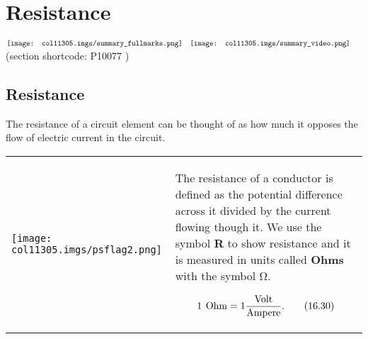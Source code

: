          \section{ Resistance}
    \nopagebreak
            \label{m38776} $ \hspace{-5pt}\begin{array}{cccccccccccc}   \texttt{[image: col11305.imgs/summary\_fullmarks.png]} &   \texttt{[image: col11305.imgs/summary\_video.png]} &   \end{array} $ \hspace{2 pt}\raisebox{-5 pt}{} {(section shortcode: P10077 )} \par 
    \label{m38776*cid5}
            \subsection{ Resistance}
            \nopagebreak
      \label{m38776*sb1235}
	The resistance of a circuit element can be thought of as how much it opposes the flow of electric current in the circuit. 
	\vspace{\rubberspace}\par
        \label{m38776*fhsst!!!underscore!!!id1729}\begin{definition}
	  \begin{tabular*}{15 cm}{m{15 mm}m{}}
	\hspace*{-50pt}  \texttt{[image: col11305.imgs/psflag2.png]}   & \Definition{   \label{id2485077}\textbf{ Resistance }} { \label{m38776*meaningfhsst!!!underscore!!!id1729}
        \label{m38776*id67260} The resistance of a conductor is defined as the potential difference across it divided by the current flowing though it. We use the symbol \textbf{R} to show resistance and it is measured in units called \textbf{Ohms} with the symbol $\mathrm{\Omega }$.\par 
        \label{m38776*id67288}\nopagebreak\noindent{}
          
    \begin{equation}
    1\phantom{\rule{4pt}{0ex}}\mathrm{Ohm}=1\frac{\mathrm{Volt}}{\mathrm{Ampere}}.\tag{16.30}
      \end{equation}
         } 
      \end{tabular*}
      \end{definition}
	\par 
      \label{m38776*uid62}
